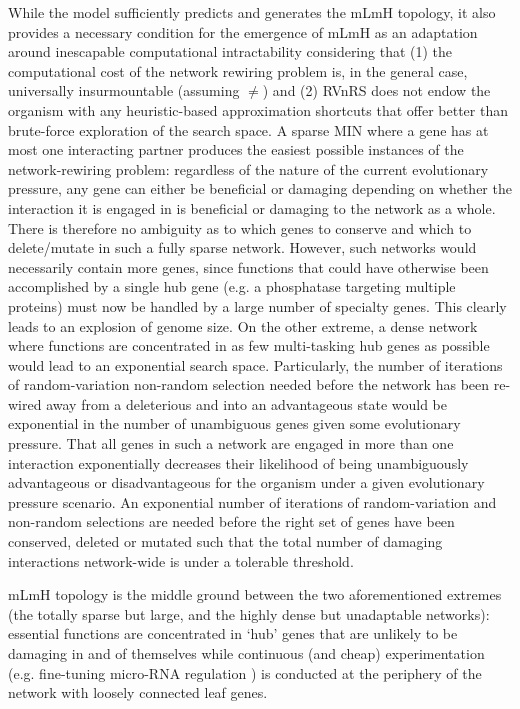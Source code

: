     While the model sufficiently predicts and generates the mLmH topology, it also provides a necessary condition for the emergence of mLmH as an adaptation around inescapable computational intractability considering that (1) the computational cost of the network rewiring problem is, in the general case, universally insurmountable (assuming $\neq$) and (2) RVnRS does not endow the organism with any heuristic-based approximation shortcuts that offer better than brute-force exploration of the search space.
    A sparse MIN where a gene has at most one interacting partner produces the easiest possible instances of the network-rewiring problem: regardless of the nature of the current evolutionary pressure, any gene can either be beneficial or damaging depending on whether the interaction it is engaged in is beneficial or damaging to the network as a whole. There is therefore no ambiguity as to which genes to conserve and which to delete/mutate in such a fully sparse network. However, such networks would necessarily contain more genes, since  functions that could have otherwise been accomplished by a single hub gene (e.g. a phosphatase targeting multiple proteins) must now be handled by a large number of specialty genes. This clearly leads to an explosion of genome size. On the other extreme, a dense network where functions are concentrated in as few  multi-tasking hub genes as possible would lead to an exponential search space. Particularly, the number of iterations of random-variation non-random selection needed before the network has been re-wired  away from a deleterious and into an advantageous state would be exponential in the number of unambiguous genes given some evolutionary pressure. That all genes in such a network are engaged in more than one interaction exponentially decreases their likelihood of being unambiguously advantageous or disadvantageous for the organism under a given evolutionary pressure scenario. An exponential number of iterations of random-variation and non-random selections are needed before the right set of genes have been conserved, deleted or mutated such that the total number of damaging interactions network-wide is under a tolerable threshold.

    mLmH topology is the middle ground between the two aforementioned extremes (the totally sparse but large, and the highly dense but unadaptable networks): essential functions are concentrated \cite{gerstein_architecture_2012} in `hub' genes that are unlikely to be damaging in and of themselves \cite{khurana_interpretation_2013}  while continuous (and cheap) experimentation (e.g. fine-tuning micro-RNA regulation \cite{gerstein_architecture_2012}) is conducted at the periphery of the network \cite{kim_positive_2007} with loosely connected leaf genes.

